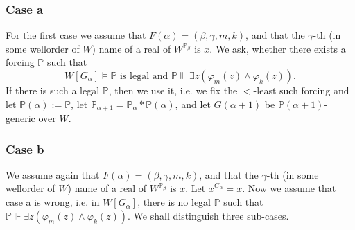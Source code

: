 \documentclass[a4paper,11pt]{article}
\newcommand{\forceP}{\mathbb{P}}
\begin{document}
\subsubsection{Case a}

For the first case we assume that $F(\alpha) = ( \beta, \gamma, m,k)$, and that 
the $\gamma$-th (in some wellorder of $W$) name of a real of $W^{\forceP_{\beta}}$ is $\dot{x}$. 
We ask, whether there exists a forcing $\forceP$ such that
\[W[G_{\alpha}] \models \forceP \text{ is legal and } \forceP \Vdash \exists z (\varphi_m(z) \land\varphi_k(z)) .\] 
If there is such a legal $\forceP$, then we use it, i.e. we fix the $<$-least such forcing and let $\forceP(\alpha):= \forceP$, let $\forceP_{\alpha+1}=\forceP_{\alpha} \ast \forceP(\alpha)$, and let $G(\alpha+1)$ be $\forceP(\alpha+1)$-generic over $W$.

\subsubsection{Case b}
We assume again that $F(\alpha) = ( \beta, \gamma, m,k)$, and that 
the $\gamma$-th (in some wellorder of $W$) name of a real of $W^{\forceP_{\beta}}$ is $\dot{x}$. Let $\dot{x}^{G_{\alpha}}=x$.
Now we assume that case a is wrong, i.e. in $W[G_{\alpha}]$, there is no legal $\forceP$ such that $\forceP \Vdash \exists z (\varphi_m(z) \land \varphi_k(z) )$.
We shall distinguish three sub-cases.
\end{document}
